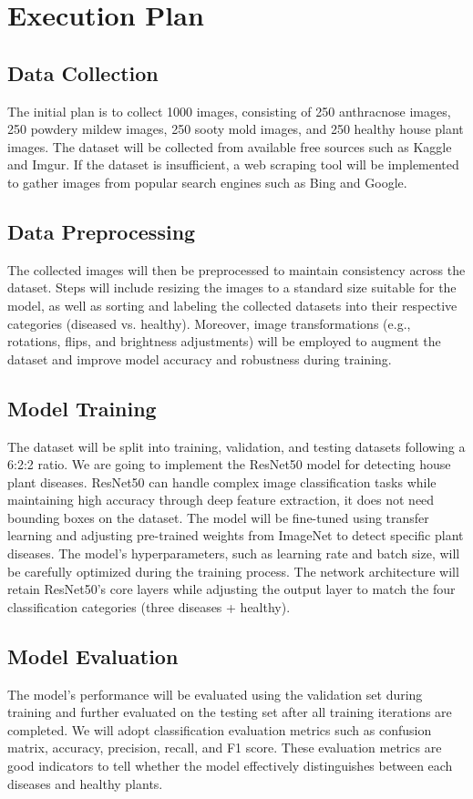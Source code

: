 \documentclass[12pt]{article}
\begin{document}
\section{Execution Plan}
\subsection{Data Collection}
The initial plan is to collect 1000 images, consisting of 250 anthracnose images, 250 powdery mildew images, 250 sooty mold images, and 250 healthy house plant images. The dataset will be collected from available free sources such as Kaggle and Imgur. If the dataset is insufficient, a web scraping tool will be implemented to gather images from popular search engines such as Bing and Google.

\subsection{Data Preprocessing}
The collected images will then be preprocessed to maintain consistency across the dataset. Steps will include resizing the images to a standard size suitable for the model, as well as sorting and labeling the collected datasets into their respective categories (diseased vs. healthy). Moreover, image transformations (e.g., rotations, flips, and brightness adjustments) will be employed to augment the dataset and improve model accuracy and robustness during training.

\subsection{Model Training}
The dataset will be split into training, validation, and testing datasets following a 6:2:2 ratio. We are going to implement the ResNet50 model for detecting house plant diseases. ResNet50 can handle complex image classification tasks while maintaining high accuracy through deep feature extraction, it does not need bounding boxes on the dataset. The model will be fine-tuned using transfer learning and adjusting pre-trained weights from ImageNet to detect specific plant diseases. The model’s hyperparameters, such as learning rate and batch size, will be carefully optimized during the training process. The network architecture will retain ResNet50's core layers while adjusting the output layer to match the four classification categories (three diseases + healthy).

\subsection{Model Evaluation}
The model’s performance will be evaluated using the validation set during training and further evaluated on the testing set after all training iterations are completed. We will adopt classification evaluation metrics such as confusion matrix, accuracy, precision, recall, and F1 score. These evaluation metrics are good indicators to tell whether the model effectively distinguishes between each diseases and healthy plants. 
\end{document}
